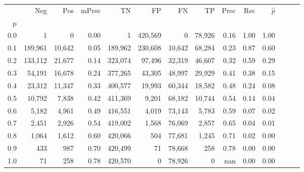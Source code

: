 \begin{tabular}{rrrrrrrrrrrrrr}
\toprule
{} &      Neg &     Pos & mPrec &       TN &       FP &      FN &      TP &  Prec &   Rec & $\hat{p}$ \\
p   &          &         &       &          &          &         &         &       &       &           \\
\midrule
0.0 &        1 &       0 &  0.00 &        1 &  420,569 &       0 &  78,926 &  0.16 &  1.00 &      1.00 \\
0.1 &  189,961 &  10,642 &  0.05 &  189,962 &  230,608 &  10,642 &  68,284 &  0.23 &  0.87 &      0.60 \\
0.2 &  133,112 &  21,677 &  0.14 &  323,074 &   97,496 &  32,319 &  46,607 &  0.32 &  0.59 &      0.29 \\
0.3 &   54,191 &  16,678 &  0.24 &  377,265 &   43,305 &  48,997 &  29,929 &  0.41 &  0.38 &      0.15 \\
0.4 &   23,312 &  11,347 &  0.33 &  400,577 &   19,993 &  60,344 &  18,582 &  0.48 &  0.24 &      0.08 \\
0.5 &   10,792 &   7,838 &  0.42 &  411,369 &    9,201 &  68,182 &  10,744 &  0.54 &  0.14 &      0.04 \\
0.6 &    5,182 &   4,961 &  0.49 &  416,551 &    4,019 &  73,143 &   5,783 &  0.59 &  0.07 &      0.02 \\
0.7 &    2,451 &   2,926 &  0.54 &  419,002 &    1,568 &  76,069 &   2,857 &  0.65 &  0.04 &      0.01 \\
0.8 &    1,064 &   1,612 &  0.60 &  420,066 &      504 &  77,681 &   1,245 &  0.71 &  0.02 &      0.00 \\
0.9 &      433 &     987 &  0.70 &  420,499 &       71 &  78,668 &     258 &  0.78 &  0.00 &      0.00 \\
1.0 &       71 &     258 &  0.78 &  420,570 &        0 &  78,926 &       0 &   nan &  0.00 &      0.00 \\
\bottomrule
\end{tabular}
